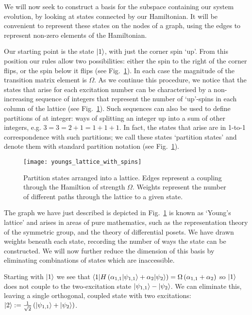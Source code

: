   We will now seek to construct a basis for the subspace containing our system evolution, by looking at states connected by our Hamiltonian. It will be convenient to represent these states on the nodes of a graph, using the edges to represent non-zero elements of the Hamiltonian.

  Our starting point is the state $\vert1\rangle$, with just the corner spin `up'. From this position our rules allow two possibilities: either the spin to the right of the corner flips, or the spin below it flips (see Fig.~\ref{partition_states}). In each case the magnitude of the transition matrix element is $\Omega$. As we continue this procedure, we notice that the states that arise for each excitation number can be characterised by a non-increasing sequence of integers that represent the number of `up'-spins in each column of the lattice (see Fig.~\ref{partition_states}). Such sequences can also be used to define partitions of at integer: ways of splitting an integer up into a sum of other integers, e.g. $3=3=2+1=1+1+1$. In fact, the states that arise are in 1-to-1 correspondence with such partitions; we call these states `partition states' and denote them with standard partition notation (see Fig.~\ref{partition_states}).
  \begin{figure}
  \texttt{[image: youngs\_lattice\_with\_spins]}
  \caption{Partition states arranged into a lattice. Edges represent a coupling
    through the Hamiltion of strength $\Omega$. Weights represent the
      number of different paths through the lattice to a given state.}
      \label{partition_states}
      \end{figure}
      The graph we have just described is depicted in Fig.~\ref{partition_states}  is known as `Young's lattice' and arises in areas of pure mathematics, such as the representation theory of the symmetric group, and the theory of differential posets. We have drawn weights beneath each state, recording the number of ways the state can be constructed. We will now further reduce the dimension of this basis
      by eliminating combinations of states which are inaccessible.

      Starting with $\vert1\rangle$ we see that $\langle 1\vert H\left(\alpha_{1,1}\vert\psi_{1,1}\rangle+ \alpha_{2}\vert\psi_{2}\rangle\right) =\Omega\left(\alpha_{1,1}+ \alpha_{2}\right)$ so $\vert1\rangle$ does not couple to the two-excitation state $\vert\psi_{1,1}\rangle-\vert\psi_{2}\rangle$. We can eliminate this, leaving a single orthogonal, coupled state with two excitations: $\vert2\rangle := \frac{1}{\sqrt{2}}\left( \vert\psi_{1,1}\rangle+\vert\psi_2\rangle \right)$.

